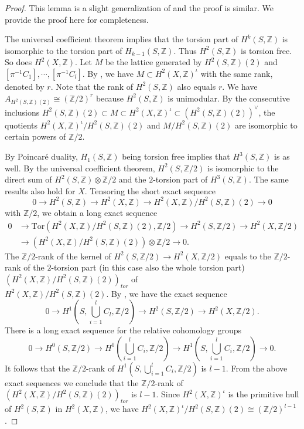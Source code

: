 \documentclass[12pt,reqno,a4paper]{amsart}
\theoremstyle{remark}
\theoremstyle{definition}
\newcommand{\ZZ}{\mathbb{Z}}
\newcommand{\Tor}{\mathrm{Tor}}
\begin{document}
\begin{proof}
This lemma is a slight generalization of \cite[Prop $3.4$]{yu2023moduli} and the proof is similar. We provide the proof here for completeness.

The universal coefficient theorem implies that the torsion part of $H^k(S,\ZZ)$ is isomorphic to the torsion part of $H_{k-1}(S,\ZZ)$. Thus $H^2(S,\ZZ)$ is torsion free. So does $H^2(X,\ZZ)$.
Let $M$ be the lattice generated by $H^2(S,\ZZ)(2)$ and $[\pi^{-1}C_1],\cdots,[\pi^{-1}C_l]$.
    By \cite[Lemma $3.3$]{yu2023moduli}, we have $M\subset H^2(X,\ZZ)^\iota$ with the same rank, denoted by $r$.
    Note that the rank of $H^2(S,\ZZ)$ also equals $r$.
    We have $A_{H^2(S,\ZZ)(2)}\cong (\ZZ/2)^{r}$ because $H^2(S,\ZZ)$ is unimodular.
    By the consecutive inclusions $H^2(S,\ZZ)(2)\subset M\subset H^2(X,\ZZ)^\iota\subset (H^2(S,\ZZ)(2))^{\vee}$, the quotients $H^2(X,\ZZ)^\iota/H^2(S,\ZZ)(2)$ and $M/H^2(S,\ZZ)(2)$ are isomorphic to certain powers of $\ZZ/2$.

    By Poincar\'e duality, $H_1(S,\ZZ)$ being torsion free implies that $H^3(S,\ZZ)$ is as well. 
    By the universal coefficient theorem, $H^2(S,\ZZ/2)$ is isomorphic to the direct sum of $H^2(S,\ZZ)\otimes\ZZ/2$ and the $2$-torsion part of $H^3(S,\ZZ)$. 
    The same results also hold for $X$.
    Tensoring the short exact sequence 
    \begin{equation*}
        0\to H^2(S,\ZZ)\to H^2(X,\ZZ)\to H^2(X,\ZZ)/H^2(S,\ZZ)(2)\to 0
    \end{equation*}
    with $\ZZ/2$, we obtain a long exact sequence 
    \begin{align*}
        0 & \to \Tor(H^2(X,\ZZ)/H^2(S,\ZZ)(2),\ZZ/2)\to H^2(S,\ZZ/2)\to H^2(X,\ZZ/2) \\
        & \to (H^2(X,\ZZ)/H^2(S,\ZZ)(2))\otimes \ZZ/2\to 0.
    \end{align*}
    The $\ZZ/2$-rank of the kernel of $H^2(S,\ZZ/2)\to H^2(X,\ZZ/2)$ equals to the $\ZZ/2$-rank of the $2$-torsion part (in this case also the whole torsion part) $(H^2(X,\ZZ)/H^2(S,\ZZ)(2))_{tor}$ of \\$H^2(X,\ZZ)/H^2(S,\ZZ)(2)$.
    By \cite[Theorem 1]{lee1995homology}, we have the exact sequence 
    \begin{equation*}
        0\to H^1(S,\bigcup_{i=1}^{l}C_l,\ZZ/2)\to H^2(S,\ZZ/2)\to H^2(X,\ZZ/2).
    \end{equation*}
    There is a long exact sequence for the relative cohomology groups
    \begin{equation*}
        0\to H^0(S,\ZZ/2)\to H^0(\bigcup_{i=1}^{l}C_i,\ZZ/2)\to H^1(S,\bigcup_{i=1}^l C_i,\ZZ/2)\to 0.
    \end{equation*}
    It follows that the $\ZZ/2$-rank of $H^1(S,\bigcup_{i=1}^l C_i,\ZZ/2)$ is $l-1$.
    From the above exact sequences we conclude that the $\ZZ/2$-rank of $(H^2(X,\ZZ)/H^2(S,\ZZ)(2))_{tor}$ is $l-1$.
    Since $H^2(X,\ZZ)^{\iota}$ is the primitive hull of $H^2(S,\ZZ)$ in $H^2(X,\ZZ)$, we have $H^2(X,\ZZ)^{\iota}/H^2(S,\ZZ)(2)\cong (\ZZ/2)^{l-1}$.
\end{proof}
\end{document}
